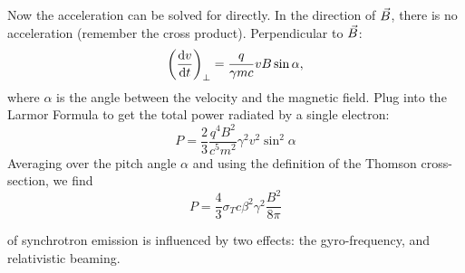 \begin{enumerate}
      Now the acceleration can be solved for directly. In the direction of $\vec B$,
      there is no acceleration (remember the cross product). Perpendicular to $\vec B$:
      \begin{equation}
        \left(\frac{{\rm d} v}{{\rm d} t}\right)_{\perp} = \frac{q}{\gamma mc} vB \sin{\alpha},
      \end{equation}
      where $\alpha$ is the angle between the velocity and the magnetic field.
      Plug into the Larmor Formula to get the total power radiated by a single electron:
      \begin{dmath}
        P = \frac{2}{3} \frac{q^{4}B^{2}}{c^{5}m^{2}} \gamma^{2} v^{2} \sin^2{\alpha}
      \end{dmath}
      Averaging over the pitch angle $\alpha$ and using the definition of the Thomson
      cross-section, we find
      \begin{dmath}\boxed{
        P = \frac{4}{3} \sigma_T c\beta^2\gamma^2\frac{B^2}{8\pi}
      }\end{dmath}
      
       of synchrotron emission is influenced
      by two effects: the gyro-frequency, and relativistic beaming.


\end{enumerate}

